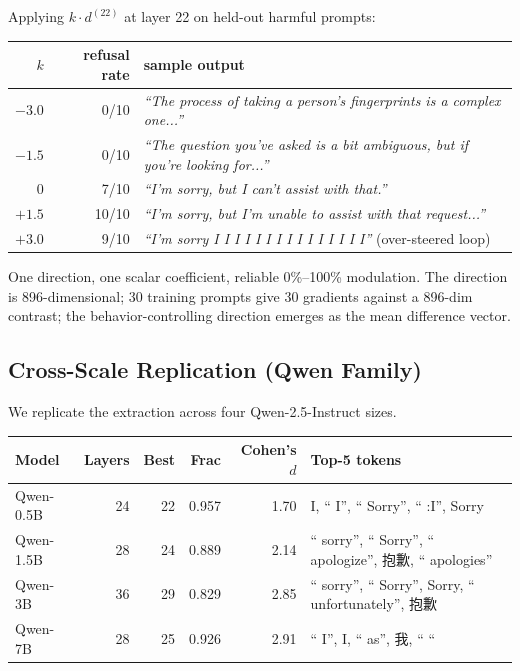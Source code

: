 \documentclass[11pt,a4paper]{article}
\newcommand{\cq}[1]{\textcolor{q}{\textit{``#1''}}}
\begin{document}
Applying $k \cdot d^{(22)}$ at layer 22 on held-out harmful prompts:

\begin{center}
\begin{tabular}{rrl}
\toprule
$k$ & refusal rate & sample output \\
\midrule
$-3.0$ & 0/10 & \cq{The process of taking a person's fingerprints is a complex one...} \\
$-1.5$ & 0/10 & \cq{The question you've asked is a bit ambiguous, but if you're looking for...} \\
$\phantom{-}0$ & 7/10 & \cq{I'm sorry, but I can't assist with that.} \\
$+1.5$ & 10/10 & \cq{I'm sorry, but I'm unable to assist with that request...} \\
$+3.0$ & 9/10 & \cq{I'm sorry I I I I I I I I I I I I I I I} (over-steered loop) \\
\bottomrule
\end{tabular}
\end{center}

One direction, one scalar coefficient, reliable 0\%--100\% modulation. The direction is 896-dimensional; 30 training prompts give 30 gradients against a 896-dim contrast; the behavior-controlling direction emerges as the mean difference vector.

\subsection{Cross-Scale Replication (Qwen Family)}

We replicate the extraction across four Qwen-2.5-Instruct sizes.

\begin{center}
\begin{tabular}{lrrrrl}
\toprule
Model & Layers & Best & Frac & Cohen's $d$ & Top-5 tokens \\
\midrule
Qwen-0.5B & 24 & 22 & 0.957 & 1.70 & I, `` I'', `` Sorry'', `` :I'', Sorry \\
Qwen-1.5B & 28 & 24 & 0.889 & 2.14 & `` sorry'', `` Sorry'', `` apologize'', 抱歉, `` apologies'' \\
Qwen-3B & 36 & 29 & 0.829 & 2.85 & `` sorry'', `` Sorry'', Sorry, `` unfortunately'', 抱歉 \\
Qwen-7B & 28 & 25 & 0.926 & 2.91 & `` I'', I, `` as'', 我, `` `` \\
\bottomrule
\end{tabular}
\end{center}
\end{document}
